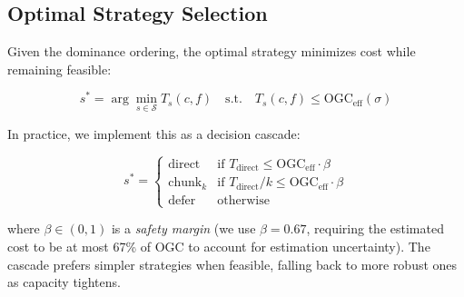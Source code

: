 \documentclass[11pt,twocolumn]{article}
\newcommand{\ogceff}{\mathrm{OGC}_{\mathrm{eff}}}
\newcommand{\Tdir}{T_{\mathrm{direct}}}
\begin{document}
\subsection{Optimal Strategy Selection}

Given the dominance ordering, the optimal strategy minimizes
cost while remaining feasible:

\begin{equation}
s^* = \arg\min_{s \in \mathcal{S}} T_s(c, f) \quad
\text{s.t.} \quad T_s(c, f) \leq \ogceff(\sigma)
\label{eq:optimal}
\end{equation}

In practice, we implement this as a decision cascade:

\begin{equation}
s^* = \begin{cases}
\text{direct} & \text{if } \Tdir \leq \ogceff \cdot \beta \\
\text{chunk}_k & \text{if } \Tdir / k \leq \ogceff \cdot \beta \\
\text{defer} & \text{otherwise}
\end{cases}
\label{eq:cascade}
\end{equation}

where $\beta \in (0, 1)$ is a \emph{safety margin} (we use $\beta = 0.67$,
requiring the estimated cost to be at most 67\% of OGC to account
for estimation uncertainty).  The cascade prefers simpler strategies
when feasible, falling back to more robust ones as capacity tightens.
\end{document}
